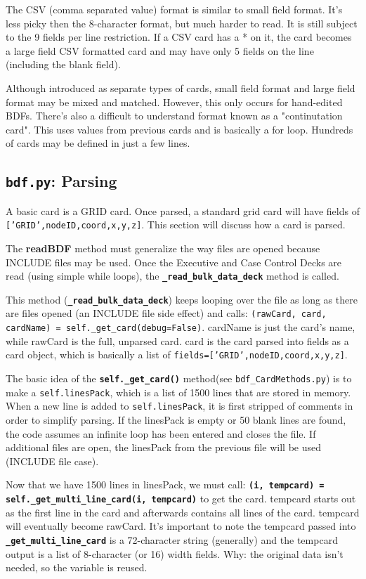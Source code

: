      The CSV (comma separated value) format is similar to small field format.  It's less picky then the 8-character format, but much harder to read.  It is still subject to the 9 fields per line restriction.  If a CSV card has a * on it, the card becomes a large field CSV formatted card and may have only 5 fields on the line (including the blank field).
     
     Although introduced as separate types of cards, small field format and large field format may be mixed and matched.  However, this only occurs for hand-edited BDFs.  There's also a difficult to understand format known as a "continutation card".  This uses values from previous cards and is basically a for loop.  Hundreds of cards may be defined in just a few lines.
     
 \subsection{{\tt bdf.py}: Parsing}
     A basic card is a GRID card.  Once parsed, a standard grid card will have fields of {\tt ['GRID',nodeID,coord,x,y,z]}.  This section will discuss how a card is parsed.  
     
     The {\bf readBDF} method must generalize the way files are opened because INCLUDE files may be used.  Once the Executive and Case Control Decks are read (using simple while loops), the {\bf \tt \_read\_bulk\_data\_deck} method is called.
     
     This method ({\bf \tt \_read\_bulk\_data\_deck}) keeps looping over the file as long as there are files opened (an INCLUDE file side effect) and calls:
     {\tt (rawCard, card, cardName) = self.\_get\_card(debug=False)}.  cardName is just the card's name, while rawCard is the full, unparsed card.  card is the card parsed into fields as a card object, which is basically a list of {\tt fields=['GRID',nodeID,coord,x,y,z]}.

     The basic idea of the {\bf \tt self.\_get\_card()} method(see {\tt bdf\_CardMethods.py}) is to make a {\tt self.linesPack}, which is a list of 1500 lines that are stored in memory.  When a new line is added to {\tt self.linesPack}, it is first stripped of comments in order to simplify parsing.  If the linesPack is empty or 50 blank lines are found, the code assumes an infinite loop has been entered and closes the file.  If additional files are open, the linesPack from the previous file will be used (INCLUDE file case).
     
     Now that we have 1500 lines in linesPack, we must call:  {\bf \tt (i, tempcard) = self.\_get\_multi\_line\_card(i, tempcard)} to get the card.  tempcard starts out as the first line in the card and afterwards contains all lines of the card. tempcard will eventually become rawCard.  It's important to note the tempcard passed into {\bf \tt \_get\_multi\_line\_card} is a 72-character string (generally) and the tempcard output is a list of 8-character (or 16) width fields.  Why: the original data isn't needed, so the variable is reused.
     
